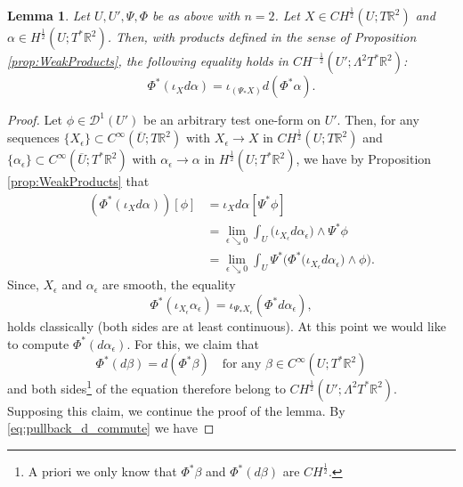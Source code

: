 \documentclass[12pt]{article}
\newcommand{\R}{\mathbb{R}}
\theoremstyle{plain}
\newtheorem{lemma}[theorem]{Lemma}
\numberwithin{equation}{section}
\begin{document}
    \begin{lemma} \label{lemma:pullback_commutation}
        Let $U,U',\Psi, \Phi$ be as above with $n=2$. Let $X \in CH^\frac12(U;T\R^2)$ and $\alpha \in H^\frac12(U;T^*\R^2)$. Then, with products defined in the sense of Proposition \ref{prop:WeakProducts}, the following equality holds in $CH^{-\frac12}(U';\Lambda^2 T^* \R^2)$:
        \begin{equation*}
            \Phi^*(\iota_{X}d\alpha) = \iota_{(\Psi_*X)} d(\Phi^*\alpha).
        \end{equation*}
    \end{lemma}
    \begin{proof}
        Let $\phi \in \mathcal{D}^1(U')$ be an arbitrary test one-form on $U'$. Then, for any sequences $\{X_\epsilon\} \subset C^\infty(\overline U;T\R^2)$ with $X_\epsilon \to X$ in $CH^\frac12(U;T\R^2)$ and $\{\alpha_\epsilon\} \subset C^\infty(\overline U;T^*\R^2)$ with $\alpha_\epsilon \to \alpha$ in $H^\frac12(U;T^*\R^2)$, we have by Proposition \ref{prop:WeakProducts} that
        \begin{align} 
                (\Phi^*(\iota_X d\alpha))[\phi] &= \iota_X d\alpha[\Psi^*\phi]\nonumber\\
                    &= \lim_{\epsilon \searrow 0} \int_U \big( \iota_{X_\epsilon}d\alpha_\epsilon\big) \wedge \Psi^*\phi\nonumber\\
                    &= \lim_{\epsilon \searrow 0} \int_U \Psi^*\Big( \Phi^*\big( \iota_{X_\epsilon}d\alpha_\epsilon\big) \wedge \phi\Big).
                    \label{eq:pullback_before_exchange}
        \end{align}
        Since, $X_\epsilon$ and $\alpha_\epsilon$ are smooth, the equality
        \begin{equation*}
            \Phi^*(\iota_{X_\epsilon} \alpha_\epsilon) = \iota_{\Psi_*X_\epsilon} (\Phi^*d\alpha_\epsilon),
        \end{equation*}
        holds classically (both sides are at least continuous). At this point we would like to compute $\Phi^*(d\alpha_\epsilon)$. For this, we claim  that
        \begin{equation} \label{eq:pullback_d_commute}
            \Phi^*(d\beta) = d(\Phi^*\beta) \quad \text{for any } \beta \in C^\infty(U;T^*\R^2)
        \end{equation}
        and both sides\footnote{A priori we only know that $\Phi^*\beta$ and $\Phi^*(d\beta)$ are $CH^\frac12$.} of the equation therefore belong to $CH^\frac12(U';\Lambda^2 T^* \R^2)$. Supposing this claim, we continue the proof of the lemma. By \eqref{eq:pullback_d_commute} we have 

\end{proof}
\end{document}
